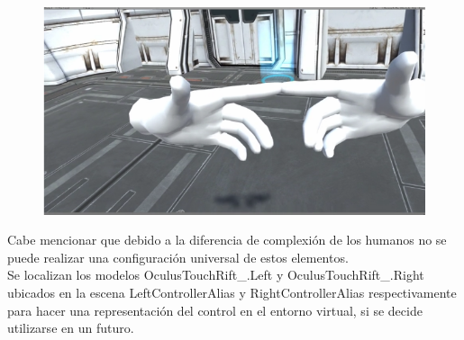 \begin{figure}[H]
	\begin{center}
 		\includegraphics[width = .5\textwidth]{source/images/image23.png}
	\end{center} 
\end{figure}
Cabe mencionar que debido a la diferencia de complexión de los humanos no se puede realizar una configuración universal de estos elementos.\\
Se localizan los modelos OculusTouchRift\_.Left y OculusTouchRift\_.Right ubicados en la  escena LeftControllerAlias y RightControllerAlias respectivamente para hacer una 
representación del control en el entorno virtual, si se decide utilizarse en un futuro.\\

